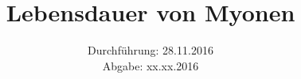 
\usepackage{showframe}

\subject{Versuch 01}
\title{Lebensdauer von Myonen}
\date{Durchführung: 28.11.2016 \\
      Abgabe: xx.xx.2016}



\maketitle
\newpage







\printbibliography


